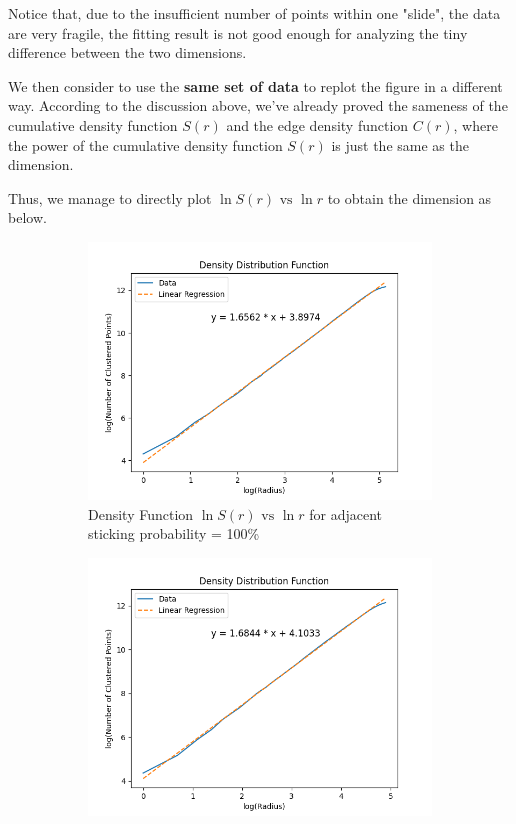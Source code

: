 \documentclass[10pt]{article}
\begin{document}
Notice that, due to the insufficient number of points within one "slide", the data are very fragile, the fitting result is not good enough for analyzing the tiny difference between the two dimensions.

We then consider to use the \textbf{same set of data} to replot the figure in a different way. According to the discussion above, we've already proved the sameness of the cumulative density function $S(r)$ and the edge density function $C(r)$, where the power of the cumulative density function $S(r)$ is just the same as the dimension.

Thus, we manage to directly plot $\ln S(r) \text{ vs } \ln r$ to obtain the dimension as below.

\newpage

\begin{figure}[h]
	\centering
	\begin{subfigure}[b]{0.3\textwidth}
		\centering
		\includegraphics[width=\textwidth]{Figure_6}
		\caption{Density Function $\ln S(r) \text{ vs } \ln r$ for adjacent sticking probability = 100\%}
	\end{subfigure}
	\begin{subfigure}[b]{0.3\textwidth}
		\centering
		\includegraphics[width=\textwidth]{Figure_7}

\end{subfigure}
\end{figure}
\end{document}
